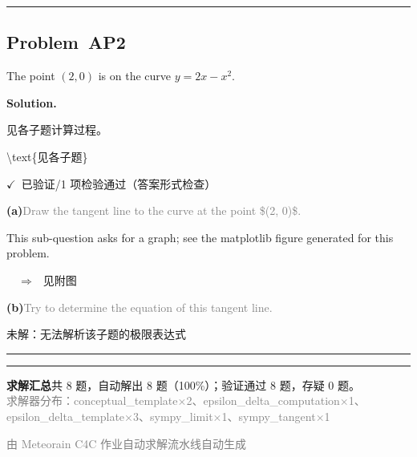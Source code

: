 \documentclass[12pt, a4paper]{article}
\newcommand{\problem}[1]{\subsection*{Problem~#1}}
\newcommand{\solution}{%
  \par\noindent
  {\color{solutiongreen}\bfseries Solution.}\par
}
\newcommand{\verifyok}{\textcolor{solutiongreen}{\ensuremath{\checkmark}\ 已验证}}
\begin{document}
\vspace{0.8em}\hrule\vspace{0.8em}

\problem{AP2}

\begin{stepbox}
The point $(2, 0)$ is on the curve $y = 2x - x^2$.
\end{stepbox}

\solution

\begin{stepbox}
见各子题计算过程。
\end{stepbox}

\begin{center}
\textbackslash{}text\{见各子题\}
\end{center}

\begin{verifybox}\small \verifyok{}/1 项检验通过（答案形式检查） \end{verifybox}

\vspace{0.3em}
\textbf{(a)}\quad \textcolor{gray}{\small Draw the tangent line to the curve at the point \$(2, 0)\$.}

This sub-question asks for a graph; see the matplotlib figure generated for this problem.

$\quad\Rightarrow\quad \text{见附图}$

\textbf{(b)}\quad \textcolor{gray}{\small Try to determine the equation of this tangent line.}

\textcolor{warnamber}{未解：无法解析该子题的极限表达式}


\vspace{0.8em}\hrule\vspace{0.8em}

\vspace{1.5em}
\hrule\vspace{0.8em}
\begin{center}\small
\textbf{求解汇总}\quad 共 8 题，自动解出 8 题（100\%）；验证通过 8 题，存疑 0 题。\\[0.3em]
\textcolor{gray}{求解器分布：conceptual\_template×2、epsilon\_delta\_computation×1、epsilon\_delta\_template×3、sympy\_limit×1、sympy\_tangent×1}
\end{center}
\vfill\begin{center}\footnotesize\textcolor{gray}{由 Meteorain C4C 作业自动求解流水线自动生成}\end{center}
\end{document}
